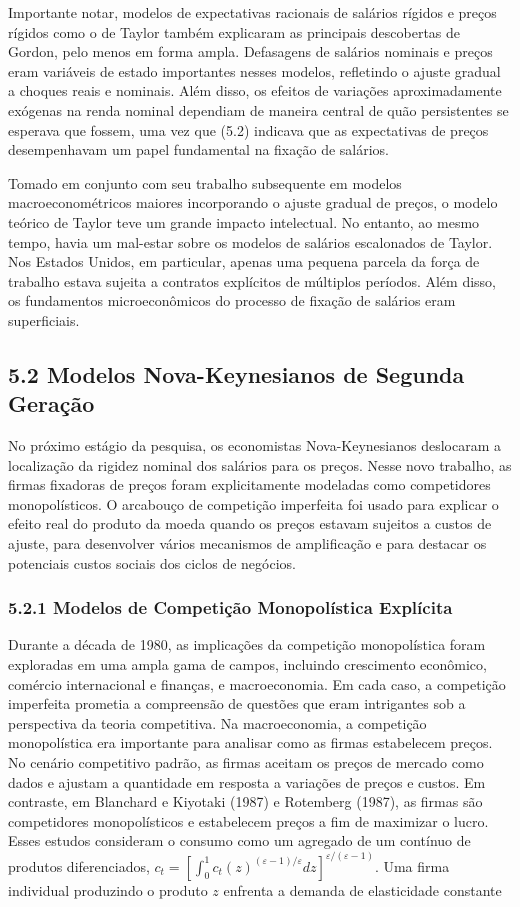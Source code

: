 \documentclass[12pt]{article}
\begin{document}
Importante notar, modelos de expectativas racionais de salários rígidos e preços rígidos como o de Taylor também explicaram as principais descobertas de Gordon, pelo menos em forma ampla. Defasagens de salários nominais e preços eram variáveis de estado importantes nesses modelos, refletindo o ajuste gradual a choques reais e nominais. Além disso, os efeitos de variações aproximadamente exógenas na renda nominal dependiam de maneira central de quão persistentes se esperava que fossem, uma vez que (5.2) indicava que as expectativas de preços desempenhavam um papel fundamental na fixação de salários.

Tomado em conjunto com seu trabalho subsequente em modelos macroeconométricos maiores incorporando o ajuste gradual de preços, o modelo teórico de Taylor teve um grande impacto intelectual. No entanto, ao mesmo tempo, havia um mal-estar sobre os modelos de salários escalonados de Taylor. Nos Estados Unidos, em particular, apenas uma pequena parcela da força de trabalho estava sujeita a contratos explícitos de múltiplos períodos. Além disso, os fundamentos microeconômicos do processo de fixação de salários eram superficiais.

\subsection{5.2 Modelos Nova-Keynesianos de Segunda Geração}

No próximo estágio da pesquisa, os economistas Nova-Keynesianos deslocaram a localização da rigidez nominal dos salários para os preços. Nesse novo trabalho, as firmas fixadoras de preços foram explicitamente modeladas como competidores monopolísticos. O arcabouço de competição imperfeita foi usado para explicar o efeito real do produto da moeda quando os preços estavam sujeitos a custos de ajuste, para desenvolver vários mecanismos de amplificação e para destacar os potenciais custos sociais dos ciclos de negócios.

\subsubsection{5.2.1 Modelos de Competição Monopolística Explícita} Durante a década de 1980, as implicações da competição monopolística foram exploradas em uma ampla gama de campos, incluindo crescimento econômico, comércio internacional e finanças, e macroeconomia. Em cada caso, a competição imperfeita prometia a compreensão de questões que eram intrigantes sob a perspectiva da teoria competitiva. Na macroeconomia, a competição monopolística era importante para analisar como as firmas estabelecem preços. No cenário competitivo padrão, as firmas aceitam os preços de mercado como dados e ajustam a quantidade em resposta a variações de preços e custos. Em contraste, em Blanchard e Kiyotaki (1987) e Rotemberg (1987), as firmas são competidores monopolísticos e estabelecem preços a fim de maximizar o lucro. Esses estudos consideram o consumo como um agregado de um contínuo de produtos diferenciados, $c_t = [\int_0^1 c_t(z)^{(\varepsilon-1)/\varepsilon} dz]^{\varepsilon/(\varepsilon-1)}$. Uma firma individual produzindo o produto $z$ enfrenta a demanda de elasticidade constante
\end{document}
